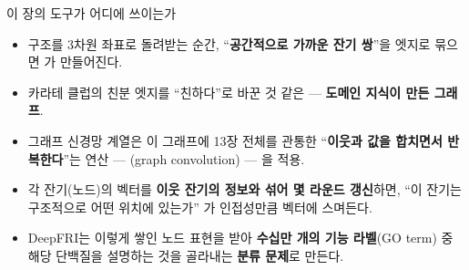 \begin{frame}{이 장의 도구가 어디에 쓰이는가}
  \begin{itemize}
    \item 구조를 3차원 좌표로 돌려받는 순간, ``\textbf{공간적으로
      가까운 잔기 쌍}''을 엣지로 묶으면 가
      만들어진다.
    \item 카라테 클럽의 친분 엣지를 ``친하다''로 바꾼 것 같은 ---
      \textbf{도메인 지식이 만든 그래프}.
    \item 그래프 신경망 계열은 이 그래프에 13장 전체를 관통한
      ``\textbf{이웃과 값을 합치면서 반복한다}''는 연산 ---
      (graph convolution) --- 을 적용.
    \item 각 잔기(노드)의 벡터를 \textbf{이웃 잔기의 정보와 섞어
      몇 라운드 갱신}하면, ``이 잔기는 구조적으로 어떤 위치에 있는가''
      가 인접성만큼 벡터에 스며든다.
    \item DeepFRI는 이렇게 쌓인 노드 표현을 받아 \textbf{수십만 개의
      기능 라벨}(GO term) 중 해당 단백질을 설명하는 것을 골라내는
      \textbf{분류 문제}로 만든다.
  \end{itemize}
\end{frame}
